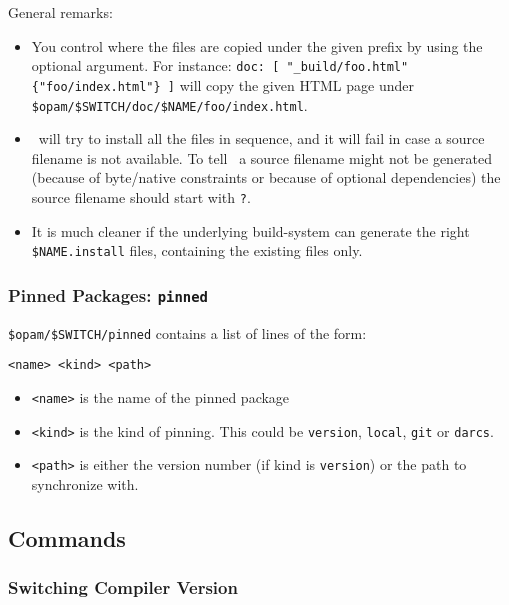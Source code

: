 \documentclass[a4paper,10pt]{article}
\begin{document}
General remarks:
\begin{itemize}

\item You control where the files are copied under the given prefix by
  using the optional argument. For instance:
  \verb+doc: [ "_build/foo.html" {"foo/index.html"} ]+ will copy the
  given HTML page under \verb+$opam/$SWITCH/doc/$NAME/foo/index.html+.

\item \OPAM\ will try to install all the files in sequence, and it will
  fail in case a source filename is not available. To tell \OPAM\ a
  source filename might not be generated (because of byte/native
  constraints or because of optional dependencies) the source filename
  should start with \verb+?+.

\item It is much cleaner if the underlying build-system can generate
  the right \verb+$NAME.install+ files, containing the existing files only.

\end{itemize}

\subsubsection{Pinned Packages: {\tt pinned}}

\verb+$opam/$SWITCH/pinned+ contains a list of lines of the form:

\begin{Verbatim}
<name> <kind> <path>
\end{Verbatim}

\begin{itemize}
\item \verb+<name>+ is the name of the pinned package

\item \verb+<kind>+ is the kind of pinning. This could be \verb+version+,
\verb+local+, \verb+git+ or \verb+darcs+.

\item \verb+<path>+ is either the version number (if kind is
  \verb+version+) or the path to synchronize with.
\end{itemize}

\subsection{Commands}

\subsubsection{Switching Compiler Version}
\end{document}
